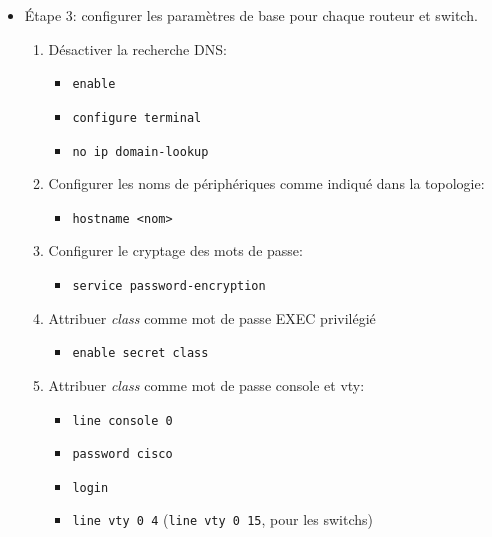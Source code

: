 \documentclass[a4paper]{article}
\begin{document}
\begin{itemize}
\item Étape 3: configurer les paramètres de base pour chaque routeur et switch.
\begin{enumerate}
    \item Désactiver la recherche DNS:
    \begin{example}
        \begin{itemize}
            \item \texttt{enable}
            \item \texttt{configure terminal}
            \item \texttt{no ip domain-lookup}
        \end{itemize}
    \end{example}
    \item Configurer les noms de périphériques comme indiqué dans la topologie:
    \begin{example}
        \begin{itemize}
            \item \texttt{hostname <nom>}
        \end{itemize}
    \end{example}
    \item Configurer le cryptage des mots de passe:
    \begin{example}
        \begin{itemize}
            \item \texttt{service password-encryption}
        \end{itemize}
    \end{example}
    \item Attribuer \textit{class} comme mot de passe EXEC privilégié
    \begin{example}
        \begin{itemize}
            \item \texttt{enable secret class}
        \end{itemize}
    \end{example}
    \item Attribuer \textit{class} comme mot de passe console et vty:
    \begin{example}
        \begin{itemize}
            \item \texttt{line console 0}
            \item \texttt{password cisco}
            \item \texttt{login}
            \item \texttt{line vty 0 4} \qquad (\texttt{line vty 0 15}, pour les switchs)

\end{itemize}
\end{example}
\end{enumerate}
\end{itemize}
\end{document}
